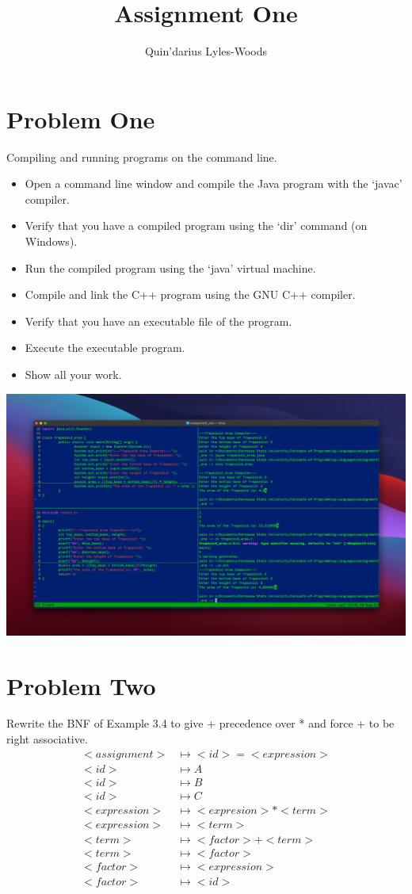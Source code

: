 \documentclass{report}
\title{Assignment One}
\author{Quin'darius Lyles-Woods}
\begin{document}
\maketitle
\section*{Problem One}

Compiling and running programs on the command line.

\begin{itemize}

	\item Open a command line window and compile the Java program with the ‘javac’ compiler.
	\item Verify that you have a compiled program using the ‘dir’ command (on Windows).
	\item Run the compiled program using the ‘java’ virtual machine.
	\item Compile and link the C++ program using the GNU C++ compiler.
	\item Verify that you have an executable file of the program.
	\item Execute the executable program.
	\item Show all your work.
\end{itemize}

\includegraphics[width=\textwidth]{trapezoid_area}

\linebreak
\section*{Problem Two}
Rewrite the BNF of Example 3.4 to give + precedence over * and force + to be right associative.
\begin{align*}
<assignment> &\mapsto <id> = <expression>\\
<id> &\mapsto A\\
<id> &\mapsto B\\
<id> &\mapsto C\\
<expression> &\mapsto <expresion> * <term>\\
<expression> &\mapsto <term>\\
<term> &\mapsto <factor> + <term>\\
<term> &\mapsto <factor>\\
<factor> &\mapsto <expression>\\
<factor> &\mapsto <id>
\end{align*}
\end{document}
